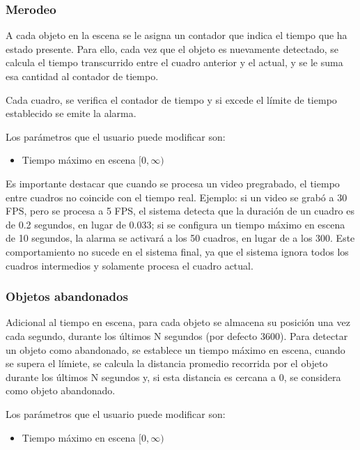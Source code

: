 \documentclass[11pt,a4paper]{article}
\begin{document}
\subsubsection{Merodeo}

A cada objeto en la escena se le asigna un contador que indica el tiempo que ha estado presente. Para ello, cada vez que el objeto es nuevamente detectado, se calcula el tiempo transcurrido entre el cuadro anterior y el actual, y se le suma esa cantidad al contador de tiempo.

Cada cuadro, se verifica el contador de tiempo y si excede el límite de tiempo establecido se emite la alarma.

Los parámetros que el usuario puede modificar son:

\begin{itemize}
    \item Tiempo máximo en escena $[0, \infty)$
\end{itemize}

Es importante destacar que cuando se procesa un video pregrabado, el tiempo entre cuadros no coincide con el tiempo real. Ejemplo: si un video se grabó a 30 FPS, pero se procesa a 5 FPS, el sistema detecta que la duración de un cuadro es de 0.2 segundos, en lugar de 0.033; si se configura un tiempo máximo en escena de 10 segundos, la alarma se activará a los 50 cuadros, en lugar de a los 300. Este comportamiento no sucede en el sistema final, ya que el sistema ignora todos los cuadros intermedios y solamente procesa el cuadro actual.

\subsubsection{Objetos abandonados}

Adicional al tiempo en escena, para cada objeto se almacena su posición una vez cada segundo, durante los últimos N segundos (por defecto 3600). Para detectar un objeto como abandonado, se establece un tiempo máximo en escena, cuando se supera el límiete, se calcula la distancia promedio recorrida por el objeto durante los últimos N segundos y, si esta distancia es cercana a 0, se considera como objeto abandonado.

Los parámetros que el usuario puede modificar son:

\begin{itemize}
    \item Tiempo máximo en escena $[0, \infty)$
\end{itemize}
\end{document}

